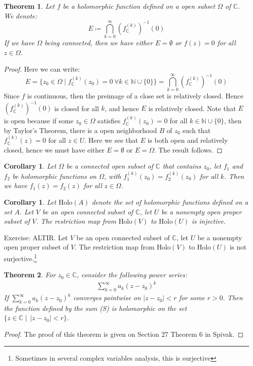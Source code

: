 \documentclass[15pt]{book}
\theoremstyle{break}
\theoremstyle{break}
\newtheorem{thm}{Theorem}[section]
\newtheorem{corT}[lem]{Corollary}
\newcommand{\N}{\mathbb{N}}
\newcommand{\Complex}{\mathbb{C}}
\newcommand{\exercise}{\color{green}Exercise: \color{black}}
\begin{document}
\begin{thm}
Let $f$ be a holomorphic function defined on a open subset $\Omega$ of $\Complex$. We denote: 
$$E \coloneqq  \bigcap_{k=0}^\infty (f_{\Complex}^{(k)})^{-1}(0)$$ 
If we have $\Omega$ being connected, then we have either $E = \emptyset$ or $f(z)= 0$ for all $z\in \Omega$. 
\end{thm}
\begin{proof}
Here we can write:
$$E = \{ z_0 \in \Omega \mid f_{\Complex}^{(k)}(z_0)=0 \ \forall k\in \N\cup \{0\} \} = \bigcap_{k=0}^\infty (f_{\Complex}^{(k)})^{-1}(0)$$
Since $f$ is continuous, then the preimage of a close set is relatively closed. Hence $(f_{\Complex}^{(k)})^{-1}(0)$ is closed for all $k$, and hence $E$ is relatively closed. Note that $E$ is open because if some $z_0 \in \Omega$ satisfies $f^{(k)}_{\Complex}(z_0) = 0$ for all $k \in \N \cup \{0\}$, then by Taylor's Theorem, there is a open neighborhood $B$ of $z_0$ such that $f^{(k)}_{\Complex}(z) = 0$ for all $z \in U$. Here we see that $E$ is both open and relatively closed, hence we must have either $E = \emptyset$ or $E = \Omega$. The result follows.
\end{proof}

\begin{corT}
Let $\Omega$ be a connected open subset of $\Complex$ that contains $z_0$, let $f_1$ and $f_2$ be holomorphic functions on $\Omega$, with $f_1^{(k)}(z_0) = f_2^{(k)}(z_0)$ for all $k$. 	Then we have $f_1(z) = f_2(z)$ for all $z \in \Omega$. 
\end{corT}

\begin{corT}
Let $\text{Holo}(A)$ denote the set of holomorphic functions defined on a set $A$. Let $V$ be an open connected subset of $\Complex$, let $U$ be a nonempty open proper subset of $V$. The restriction map from $\text{Holo}(V)$ to $\text{Holo}(U)$ is injective.
\end{corT}

\exercise ALTIR. Let $V$ be an open connected subset of $\Complex$, let $U$ be a nonempty open proper subset of $V$. The restriction map from $\text{Holo}(V)$ to $\text{Holo}(U)$ is not surjective.\footnote{Sometimes in several complex variables analysis, this is surjective}

\begin{thm}
For $z_0 \in \Complex$, consider the following power series:
\begin{align*}
\sum_{k=0}^\infty a_k(z-z_0)^k \tag{S}
\end{align*}
If $\sum_{k=0}^\infty a_k(z-z_0)^k$ converges pointwise on $|z-z_0| <r$ for some $r >0$. Then the function defined by the sum (S) is holomorphic on the set $\{ z \in \Complex \mid \, |z-z_0|<r\}$. 
\end{thm}
\begin{proof}
The proof of this theorem is given on Section 27 Theorem 6 in Spivak.
\end{proof}
\end{document}
